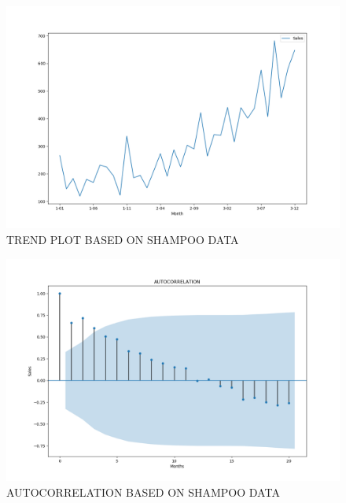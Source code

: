\documentclass[12pt, letterpaper, twoside]{article}
\begin{document}
\begin{figure}[bp!]                                                                                                                                                                 \centering
	        \includegraphics[width=1\textwidth]{Shampoo_data_Trend_plot.png}
			                    \caption{TREND PLOT BASED ON SHAMPOO DATA}
					                            \label{fig:2.1}
\end{figure}

\begin{figure}[bp!]
	    \centering
		\includegraphics[width=1\textwidth]{SHAMPOO_DATA_ACF_PLOT.png}
		    \caption{AUTOCORRELATION BASED ON SHAMPOO DATA}
		        \label{fig:2.2}
\end{figure}
\end{document}
